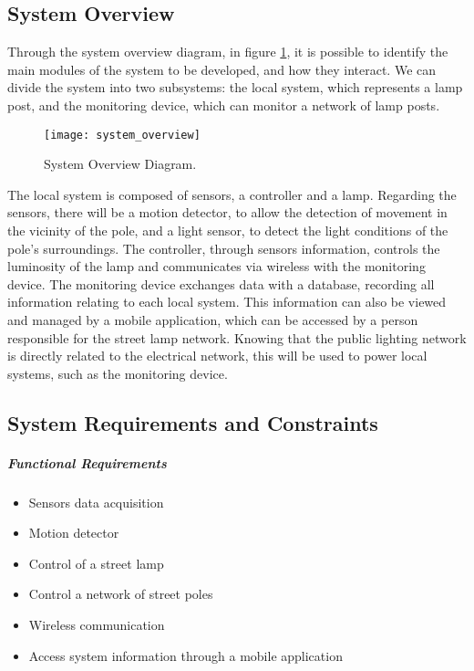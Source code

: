 \subsection{System Overview}
Through the system overview diagram, in figure \ref{fig:system_overview}, it is possible to identify the main modules of the system to be developed, and how they interact. We can divide the system into two subsystems: the local system, which represents a lamp post, and the monitoring device, which can monitor a network of lamp posts.

\begin{figure}[ht]
	\centering
	\texttt{[image: system\_overview]}
	\caption{System Overview Diagram.}
	\label{fig:system_overview}
\end{figure}

The local system is composed of sensors, a controller and a lamp. Regarding the sensors, there will be a motion detector, to allow the detection of movement in the vicinity of the pole, and a light sensor, to detect the light conditions of the pole’s surroundings. The controller, through sensors information, controls the luminosity of the lamp and communicates via wireless with the monitoring device. The monitoring device exchanges data with a database, recording all information relating to each local system. This information can also be viewed and managed by a mobile application, which can be accessed by a person responsible for the street lamp network. Knowing that the public lighting network is directly related to the electrical network, this will be used to power local systems, such as the monitoring device.

\subsection{System Requirements and Constraints}

\noindent
\subparagraph{Functional Requirements}
\begin{itemize}
	\item Sensors data acquisition				\item Motion detector
	\item Control of a street lamp
	\item Control a network of street poles		\item Wireless communication
	\item Access system information through a mobile application
\end{itemize}

